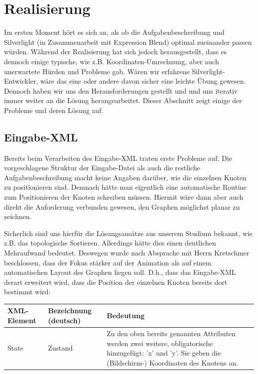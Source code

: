 \section{Realisierung}
Im ersten Moment hört es sich an, als ob die Aufgabenbeschreibung und
Silverlight (in Zusammenarbeit mit Expression Blend) optimal zueinander passen
würden. Während der Realisierung hat sich jedoch herausgestellt, dass es
dennoch einige typische, wie z.B. Koordinaten-Umrechnung, aber auch unerwartete
Hürden und Probleme gab. Wären wir erfahrene Silverlight-Entwickler, wäre das
eine oder andere davon sicher eine leichte Übung gewesen. Dennoch haben wir uns
den Herausforderungen gestellt und und uns iterativ immer weiter an die Lösung
herangearbeitet. Dieser Abschnitt zeigt einige der Probleme und deren Lösung
auf.

\subsection{Eingabe-XML}
Bereits beim Verarbeiten des Eingabe-XML traten erste Probleme auf. Die
vorgeschlagene Struktur der Eingabe-Datei als auch die restliche
Aufgabenbeschreibung macht keine Angaben darüber, wie die einzelnen Knoten zu
positionieren sind. Demnach hätte man eigentlich eine automatische Routine zum
Positionieren der Knoten schreiben müssen. Hiermit wäre dann aber auch direkt
die Anforderung verbunden gewesen, den Graphen möglichst planar zu zeichnen.

Sicherlich sind uns hierfür die Lösungsansätze aus unserem Studium bekannt, wie
z.B. das topologische Sortieren. Allerdings hätte dies einen deutlichen
Mehraufwand bedeutet. Deswegen wurde nach Absprache mit Herrn Kretschmer
beschlossen, dass der Fokus stärker auf der Animation als auf einem
automatischen Layout des Graphen liegen soll. D.h., dass das Eingabe-XML derart
erweitert wird, dass die Position der einzelnen Knoten bereits dort bestimmt
wird:

\begin{table}[H]
	\centering
	\begin{tabular}{|l|l|l|}\hline
XML-Element & Bezeichnung (deutsch) & Bedeutung \\ \hline
State       & Zustand               & 
\begin{minipage}{0.5\textwidth}
		Zu den oben bereits genannten Attributen werden zwei weitere, obligatorische
		hinzugefügt: 'x' und 'y'. Sie geben die (Bildschirm-) Koordinaten des Knotens
		an.\vspace{1ex}
	\end{minipage}\\ \hline
\end{tabular}
\end{table}

